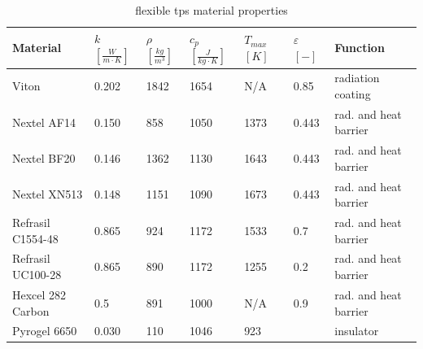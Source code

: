 \begin{table}[H]
	\caption {flexible \acrfull{tps} material properties}
	\centering
	\begin{tabular}{|l|l|l|l|l|l|l|}
		\hline
		\textbf{Material}         & \textbf{ $ k $ $ \left[ \frac{W}{m \cdot K} \right] $} & \textbf{ $ \rho $ $ \left[ \frac{kg}{m^3} \right] $} & \textbf{  $ c_{p} $ $ \left[ \frac{J}{kg \cdot K} \right] $ }& \textbf{ $ T_{max} $ $ [ K ] $} &\textbf{ $ \varepsilon $ $ [ - ] $} & \textbf{Function} \\[1.6ex]   \hline \hline
		Viton       & 0.202 & 1842 & 1654 & N/A	 & 0.85 & radiation coating
		\\ \hline
		Nextel AF14       & 0.150                                                 & 858                                        & 1050                                            & 1373	 & 0.443    & rad. and heat barrier                                 \\ \hline
		Nextel BF20       & 0.146 
		& 1362                                        & 1130 
		& 1643	 & 0.443  & rad. and heat barrier                                  
		\\ \hline
		Nextel XN513      & 0.148                                                 & 1151                                       & 1090                                            & 1673	 & 0.443           & rad. and heat barrier                               \\ \hline
		Refrasil C1554-48 & 0.865                                                 & 924                                        & 1172                                            & 1533	 & 0.7     & rad. and heat barrier                                       \\ \hline
		Refrasil UC100-28 & 0.865                                                 & 890                                        & 1172                                            & 1255  & 0.2       & rad. and heat barrier                                    \\ \hline
		Hexcel 282 Carbon & 0.5                                                   & 891                                        & 1000                                            & N/A 	 & 0.9      & rad. and heat barrier                                     \\ \hline
		Pyrogel 6650      & 0.030                                                 & 110                                        & 1046                                            & 923    & ~        & insulator                                  \\ \hline

\end{tabular}
\end{table}
